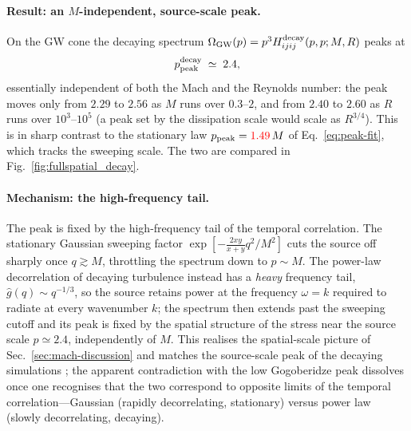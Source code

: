 \documentclass[10pt,prd,aps,nobibnotes,superscriptaddress,preprintnumbers,notitlepage]{revtex4-1}
\newcommand{\add}[1]{{\color{red}#1}}
\newcommand{\add}[1]{#1}
\begin{document}
\paragraph{Result: an $M$-independent, source-scale peak.}
On the GW cone the decaying spectrum
$\Omega_{\rm GW}(p)=p^3 H^{\rm decay}_{ijij}(p,p;M,R)$ peaks at
\begin{equation}
  p_{\rm peak}^{\rm decay}\;\simeq\;2.4,
  \label{eq:decay-peak}
\end{equation}
essentially independent of both the Mach and the Reynolds number: the peak moves
only from $2.29$ to $2.56$ as $M$ runs over $0.3$--$2$, and from $2.40$ to $2.60$
as $R$ runs over $10^3$--$10^5$ (a peak set by the dissipation scale would scale as
$R^{3/4}$). This is in sharp contrast to the stationary law $p_{\rm peak}=\add{1.49}\,M$
of Eq.~\eqref{eq:peak-fit}, which tracks the sweeping scale. The two are compared
in Fig.~\ref{fig:fullspatial_decay}.

\paragraph{Mechanism: the high-frequency tail.}
The peak is fixed by the high-frequency tail of the temporal correlation. The
stationary Gaussian sweeping factor $\exp[-\tfrac{2xy}{x+y}q^2/M^2]$ cuts the
source off sharply once $q\gtrsim M$, throttling the spectrum down to $p\sim M$.
The power-law decorrelation of decaying turbulence instead has a \emph{heavy}
frequency tail, $\hat g(q)\sim q^{-1/3}$, so the source retains power at the
frequency $\omega=k$ required to radiate at every wavenumber $k$; the spectrum then
extends past the sweeping cutoff and its peak is fixed by the spatial structure of
the stress near the source scale $p\simeq2.4$, independently of $M$. This realises
the spatial-scale picture of Sec.~\ref{sec:mach-discussion} and matches the
source-scale peak of the decaying simulations \cite{RoperPol:2019wvy}; the apparent
contradiction with the low Gogoberidze peak dissolves once one recognises that the
two correspond to opposite limits of the temporal correlation---Gaussian (rapidly
decorrelating, stationary) versus power law (slowly decorrelating, decaying).
\end{document}
